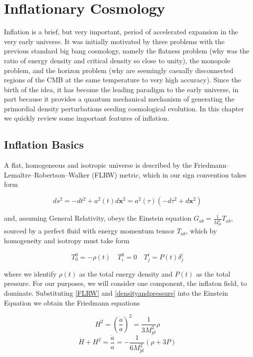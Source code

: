 \documentclass[a4paper,10pt]{article}
\renewcommand{\v}[1]{\mathbf{#1}}
\newcommand{\Mp}{M_{pl}}
\begin{document}
\section{Inflationary Cosmology}
\nocite{*}


Inflation is a brief, but very important, period of accelerated expansion in the very early universe. It was initially motivated by three problems with the previous standard big bang cosmology, namely the flatness problem (why was the ratio of energy density and critical density so close to unity), the monopole problem, and the horizon problem (why are seemingly casually disconnected regions of the CMB at the same temperature to very high accuracy). Since the birth of the idea, it has become the leading paradigm to the early universe, in part because it provides a quantum mechanical mechanism of generating the primordial density perturbations seeding cosmological evolution. In this chapter we quickly review some important features of inflation.

\subsection{Inflation Basics}

A flat, homogeneous and isotropic universe is described by the Friedmann–Lemaître–Robertson–Walker (FLRW) metric, which in our sign convention takes form

\begin{equation}
\label{FLRW}
ds^2 = - dt^2 + a^2(t)d\v{x}^2 = a^2(\tau)(-d\tau^2+d\v{x}^2)
\end{equation}

and, assuming General Relativity, obeys the Einstein equation $G_{ab} = \frac{1}{\Mp^2} T_{ab}$, sourced by a perfect fluid with energy momentum tensor $T_{ab}$, which by homogeneity and isotropy must take form

\begin{equation}
\label{densityandpressure}
T^0_0 = - \rho(t) \quad T^0_i = 0 \quad T^i_j = P(t)\delta^i_j
\end{equation}

where we  identify $\rho(t)$ as the total energy density and $P(t)$ as the total pressure. For our purposes, we will consider one component, the inflaton field, to dominate.  Substituting \ref{FLRW} and \ref{densityandpressure} into the Einstein Equation we obtain the Friedmann equations

\begin{equation}
H^2 = (\frac{\dot{a}}{a})^2 = \frac{1}{3\Mp^2}\rho
\tag{F1}
\label{F1}
\end{equation}
\begin{equation}
\dot{H} + H^2 = \frac{\ddot{a}}{a} = -\frac{1}{6\Mp^2}(\rho + 3P)
\tag{F2}
\label{F2}
\end{equation}
\end{document}
